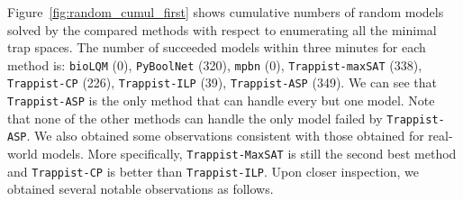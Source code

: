 \documentclass[preprint,12pt]{elsarticle}
\begin{document}


Figure~\ref{fig:random_cumul_first} shows cumulative numbers of random models solved by the compared methods with respect to enumerating all the minimal trap spaces.
The number of succeeded models within three minutes for each method is: \texttt{bioLQM} (0), \texttt{PyBoolNet} (320), \texttt{mpbn} (0), \texttt{Trappist-maxSAT} (338), \texttt{Trappist-CP} (226), \texttt{Trappist-ILP} (39), \texttt{Trappist-ASP} (349).
We can see that \texttt{Trappist-ASP} is the only method that can handle every but one model.
Note that none of the other methods can handle the only model failed by \texttt{Trappist-ASP}.
We also obtained some observations consistent with those obtained for real-world models.
More specifically, \texttt{Trappist-MaxSAT} is still the second best method and \texttt{Trappist-CP} is better than \texttt{Trappist-ILP}.
Upon closer inspection, we obtained several notable observations as follows.
\end{document}
